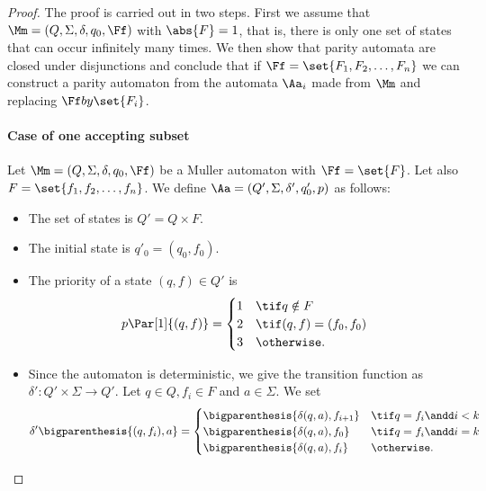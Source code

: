 \begin{proof}
    The proof is carried out in two steps.
    First we assume that $\Mm = (Q, \Sigma, \delta, q_0, \Ff)$
    with $\abs{F} = 1$, that is, there is only one set
    of states that can occur infinitely many times.
    We then show that parity automata are closed under disjunctions
    and conclude that if $\Ff = \set{F_1, F_2, \dots, F_n}$
    we can construct a parity automaton from the automata
    $\Aa_i$ made from $\Mm$ and replacing $\Ff by \set{F_i}$.

    \paragraph*{Case of one accepting subset}
    Let $\Mm = (Q, \Sigma, \delta, q_0, \Ff)$ be a Muller automaton
    with $\Ff = \set{F}$. Let also $F = \set{f_1, f_2, \dots, f_n}$.
    We define $\Aa = (Q', \Sigma, \delta', q'_0, p)$ as follows:
    \begin{itemize}
        \item The set of states is $Q' = Q \times F$.
        \item The initial state is $q'_0 = (q_0, f_0)$.
        \item The priority of a state $(q, f) \in Q'$ is \[
            p\Par[1]{(q, f)} = \begin{cases}
                1 & \tif q \notin F \\
                2 & \tif (q, f) = (f_0, f_0) \\
                3 & \otherwise.
            \end{cases}
        \]
        \item Since the automaton is deterministic, we give the transition
            function as $\delta': Q' \times \Sigma \to Q'$. Let $q \in Q, f_i \in F$
            and $a \in \Sigma$. We set \[
            \delta'\bigparenthesis{(q, f_i), a} = \begin{cases}
                \bigparenthesis{\delta(q, a), f_{i+1}} & \tif q = f_i \andd i < k \\
                \bigparenthesis{\delta(q, a), f_0} & \tif q = f_i \andd i = k \\
                \bigparenthesis{\delta(q, a), f_i} & \otherwise.
            \end{cases}
        \]
    \end{itemize}


\end{proof}
